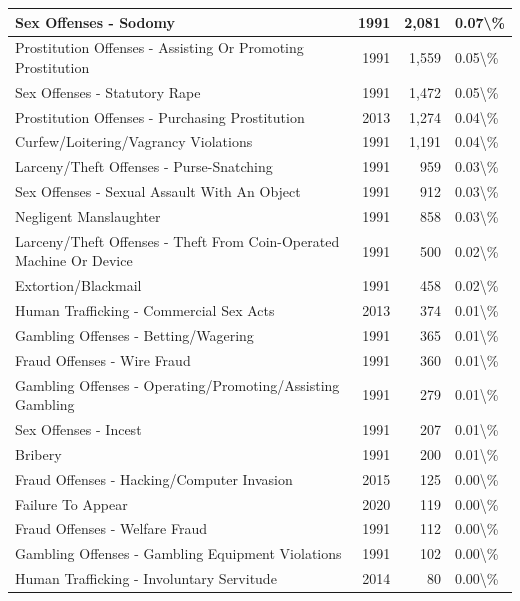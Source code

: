 \documentclass[
]{krantz}
\begin{document}
\begin{longtable}[t]{l|r|r|l}
\hline
Sex Offenses - Sodomy & 1991 & 2,081 & 0.07\textbackslash{}\%\\
\hline
Prostitution Offenses - Assisting Or Promoting Prostitution & 1991 & 1,559 & 0.05\textbackslash{}\%\\
\hline
Sex Offenses - Statutory Rape & 1991 & 1,472 & 0.05\textbackslash{}\%\\
\hline
Prostitution Offenses - Purchasing Prostitution & 2013 & 1,274 & 0.04\textbackslash{}\%\\
\hline
Curfew/Loitering/Vagrancy Violations & 1991 & 1,191 & 0.04\textbackslash{}\%\\
\hline
Larceny/Theft Offenses - Purse-Snatching & 1991 & 959 & 0.03\textbackslash{}\%\\
\hline
Sex Offenses - Sexual Assault With An Object & 1991 & 912 & 0.03\textbackslash{}\%\\
\hline
Negligent Manslaughter & 1991 & 858 & 0.03\textbackslash{}\%\\
\hline
Larceny/Theft Offenses - Theft From Coin-Operated Machine Or Device & 1991 & 500 & 0.02\textbackslash{}\%\\
\hline
Extortion/Blackmail & 1991 & 458 & 0.02\textbackslash{}\%\\
\hline
Human Trafficking - Commercial Sex Acts & 2013 & 374 & 0.01\textbackslash{}\%\\
\hline
Gambling Offenses - Betting/Wagering & 1991 & 365 & 0.01\textbackslash{}\%\\
\hline
Fraud Offenses - Wire Fraud & 1991 & 360 & 0.01\textbackslash{}\%\\
\hline
Gambling Offenses - Operating/Promoting/Assisting Gambling & 1991 & 279 & 0.01\textbackslash{}\%\\
\hline
Sex Offenses - Incest & 1991 & 207 & 0.01\textbackslash{}\%\\
\hline
Bribery & 1991 & 200 & 0.01\textbackslash{}\%\\
\hline
Fraud Offenses - Hacking/Computer Invasion & 2015 & 125 & 0.00\textbackslash{}\%\\
\hline
Failure To Appear & 2020 & 119 & 0.00\textbackslash{}\%\\
\hline
Fraud Offenses - Welfare Fraud & 1991 & 112 & 0.00\textbackslash{}\%\\
\hline
Gambling Offenses - Gambling Equipment Violations & 1991 & 102 & 0.00\textbackslash{}\%\\
\hline
Human Trafficking - Involuntary Servitude & 2014 & 80 & 0.00\textbackslash{}\%\\

\end{longtable}
\end{document}
